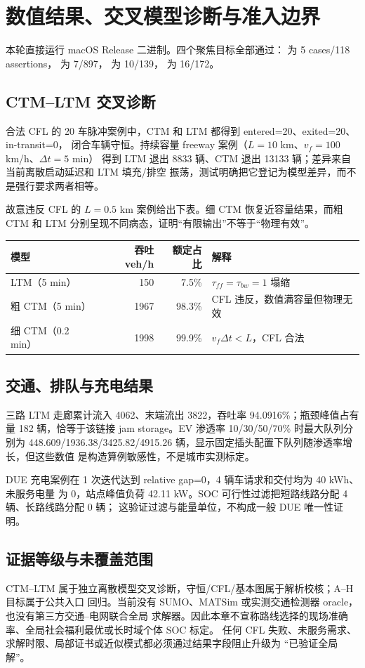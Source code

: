 \section{数值结果、交叉模型诊断与准入边界}\label{sec:evpt-numerical}

本轮直接运行 macOS Release 二进制。四个聚焦目标全部通过：
 为 5 cases/118 assertions，
 为 7/897，
 为 10/139，
 为 16/172。

\subsection{CTM--LTM 交叉诊断}
合法 CFL 的 20 车脉冲案例中，CTM 和 LTM 都得到 entered=20、exited=20、in-transit=0，
闭合车辆守恒。持续容量 freeway 案例（$L=10$ km、$v_f=100$ km/h、$\Delta t=5$ min）
得到 LTM 退出 8833 辆、CTM 退出 13133 辆；差异来自当前离散启动延迟和 LTM 填充/排空
振荡，测试明确把它登记为模型差异，而不是强行要求两者相等。

故意违反 CFL 的 $L=0.5$ km 案例给出下表。细 CTM 恢复近容量结果，而粗 CTM 和 LTM
分别呈现不同病态，证明“有限输出”不等于“物理有效”。
\begin{center}\small
\begin{tabular}{@{}L{5.3cm}rrL{4.5cm}@{}}
\toprule 模型 & 吞吐 veh/h & 额定占比 & 解释\\\midrule
LTM（5 min） & 150 & 7.5\% & $\tau_{ff}=\tau_{bw}=1$ 塌缩\\
粗 CTM（5 min） & 1967 & 98.3\% & CFL 违反，数值满容量但物理无效\\
细 CTM（0.2 min） & 1998 & 99.9\% & $v_f\Delta t<L$，CFL 合法\\
\bottomrule
\end{tabular}
\end{center}

\subsection{交通、排队与充电结果}
三路 LTM 走廊累计流入 4062、末端流出 3822，吞吐率 94.0916\%；瓶颈峰值占有量
182 辆，恰等于该链接 jam storage。EV 渗透率 10/30/50/70\% 时最大队列分别为
448.609/1936.38/3425.82/4915.26 辆，显示固定插头配置下队列随渗透率增长，但这些数值
是构造算例敏感性，不是城市实测标定。

DUE 充电案例在 1 次迭代达到 relative gap=0，4 辆车请求和交付均为 40 kWh、未服务电量
为 0，站点峰值负荷 42.11 kW。SOC 可行性过滤把短路线路分配 4 辆、长路线路分配 0 辆；
这验证过滤与能量单位，不构成一般 DUE 唯一性证明。

\subsection{证据等级与未覆盖范围}
CTM--LTM 属于独立离散模型交叉诊断，守恒/CFL/基本图属于解析校核；A--H 目标属于公共入口
回归。当前没有 SUMO、MATSim 或实测交通检测器 oracle，也没有第三方交通--电网联合全局
求解器。因此本章不宣称路线选择的现场准确率、全局社会福利最优或长时域个体 SOC 标定。
任何 CFL 失败、未服务需求、求解时限、局部证书或近似模式都必须通过结果字段阻止升级为
“已验证全局解”。
